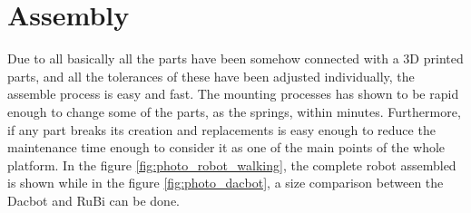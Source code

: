 \section{Assembly} %
\label{sec:assembly}
Due to all basically all the parts have been somehow connected with a 3D printed parts, and all the tolerances of these have been adjusted individually, the assemble process is easy and fast.
The mounting processes has shown to be rapid enough to change some of the parts, as the springs, within minutes.
Furthermore, if any part breaks its creation and replacements is easy enough to reduce the maintenance time enough to consider it as one of the main points of the whole platform.
In the figure \ref{fig:photo_robot_walking}, the complete robot assembled is shown while in the figure \ref{fig:photo_dacbot}, a size comparison between the Dacbot \cite{dacbot1} and RuBi can be done.

